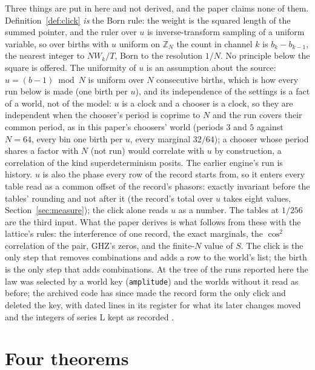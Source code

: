 \documentclass[11pt]{article}
\theoremstyle{definition}
\newcommand{\Z}{\mathbb{Z}}
\newcommand{\rung}{b}
\begin{document}
Three things are put in here and not derived, and the paper claims none
of them. Definition~\ref{def:click} \emph{is} the Born rule: the weight is
the squared length of the summed pointer, and the ruler over $u$ is
inverse-transform sampling of a uniform variable, so over births with $u$
uniform on $\Z_N$ the count in channel $k$ is $\rung_k - \rung_{k-1}$, the
nearest integer to $N W_k/T$, Born to the resolution $1/N$. No principle
below the square is offered. The uniformity of $u$ is an assumption about
the source: $u = (b - 1) \bmod N$ is uniform over $N$ consecutive births,
which is how every run below is made (one birth per $u$), and its
independence of the settings is a fact of a world, not of the model: $u$
is a clock and a chooser is a clock, so they are independent when the
chooser's period is coprime to $N$ and the run covers their common
period, as in this paper's choosers' world (periods $3$ and $5$ against
$N = 64$, every bin one birth per $u$, every marginal $32/64$); a chooser
whose period shares a factor with $N$ (not run) would correlate with $u$
by construction, a correlation of the kind superdeterminism posits. The earlier engine's run \cite{paper1}
is history. $u$ is also the phase every row of
the record starts from, so it enters every table read as a common offset
of the record's phasors: exactly invariant before the tables' rounding
and not after it (the record's total over $u$ takes eight values,
Section~\ref{sec:measure}); the click alone reads $u$ as a number. The
tables at $1/256$ are the third input. What the paper derives is what
follows from these with the
lattice's rules: the interference of one record, the exact marginals, the
$\cos^2$ correlation of the pair, GHZ's zeros, and the finite-$N$ value
of $S$. The click is the only step that removes combinations and adds a
row to the world's list; the birth is the only step that adds
combinations. At the tree of the runs reported here the law was selected by a world
key (\texttt{amplitude}) and the worlds without it read as before; the
archived code has since made the record form the only click and deleted
the key, with dated lines in its register for what its later changes
moved and the integers of series L kept as recorded \cite{beamlaw,register}.

\section{Four theorems}\label{sec:theorems}
\end{document}
